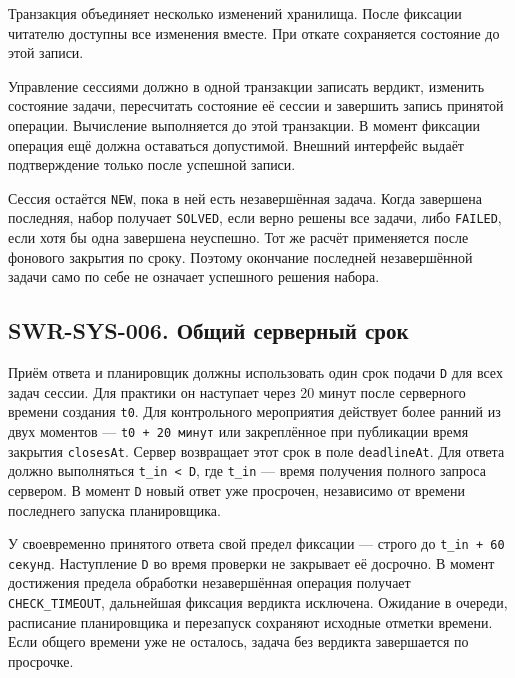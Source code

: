 \documentclass[12pt,a4paper]{article}
\begin{document}
\hypertarget{swr-sys-005}{}

Транзакция объединяет несколько изменений хранилища. После фиксации читателю доступны все изменения вместе. При откате сохраняется состояние до этой записи.

Управление сессиями должно в одной транзакции записать вердикт, изменить состояние задачи, пересчитать состояние её сессии и завершить запись принятой операции. Вычисление выполняется до этой транзакции. В момент фиксации операция ещё должна оставаться допустимой. Внешний интерфейс выдаёт подтверждение только после успешной записи.

Сессия остаётся \texttt{NEW}, пока в ней есть незавершённая задача. Когда завершена последняя, набор получает \texttt{SOLVED}, если верно решены все задачи, либо \texttt{FAILED}, если хотя бы одна завершена неуспешно. Тот же расчёт применяется после фонового закрытия по сроку. Поэтому окончание последней незавершённой задачи само по себе не означает успешного решения набора.

\subsection{SWR-SYS-006. Общий серверный срок}\label{swr-sys-006-ux43eux431ux449ux438ux439-ux441ux435ux440ux432ux435ux440ux43dux44bux439-ux441ux440ux43eux43a}

\hypertarget{swr-sys-006-общий-серверный-срок}{}

\hypertarget{swr-sys-006}{}

Приём ответа и планировщик должны использовать один срок подачи \texttt{D} для всех задач сессии. Для практики он наступает через 20 минут после серверного времени создания \texttt{t0}. Для контрольного мероприятия действует более ранний из двух моментов --- \texttt{t0\ +\ 20\ минут} или закреплённое при публикации время закрытия \texttt{closesAt}. Сервер возвращает этот срок в поле \texttt{deadlineAt}. Для ответа должно выполняться \texttt{t\_in\ \textless{}\ D}, где \texttt{t\_in} --- время получения полного запроса сервером. В момент \texttt{D} новый ответ уже просрочен, независимо от времени последнего запуска планировщика.

У своевременно принятого ответа свой предел фиксации --- строго до \texttt{t\_\allowbreak{}in + 60 секунд}. Наступление \texttt{D} во время проверки не закрывает её досрочно. В момент достижения предела обработки незавершённая операция получает \texttt{CHECK\_\allowbreak{}TIMEOUT}, дальнейшая фиксация вердикта исключена. Ожидание в очереди, расписание планировщика и перезапуск сохраняют исходные отметки времени. Если общего времени уже не осталось, задача без вердикта завершается по просрочке.
\end{document}
